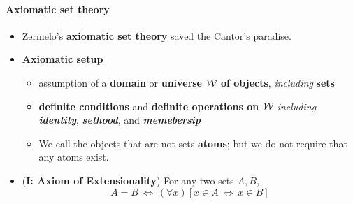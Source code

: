 \documentclass{myproc}
\begin{document}
\paragraph{Axiomatic set theory}
\begin{itemize}
\item Zermelo's {\bf{}axiomatic set theory} saved the Cantor's paradise.
\item {\bf{}Axiomatic setup}
	\begin{itemize}
	\item assumption of a {\bf{}domain} or {\bf{}universe $\cal{}W$ of
	objects}, {\em{}including} {\bf{}sets}
	\item {\bf{}definite conditions} and {\bf{}definite operations on 
		$\cal{}W$} {\em{}including} 
		{\em{}\bfseries{}identity},
		{\em{}\bfseries{}sethood}, and
		{\em{}\bfseries{}memebersip}
	\item We call the objects that are not sets {\bf{}atoms}; but we 
		do not require that any atoms exist.
	\end{itemize}
\item ({\bf{}I: Axiom of Extensionality}) For any two sets
	$A, B$,
		\[ A = B \ \Leftrightarrow\ (\forall{x})[x \in A \ \Leftrightarrow\ 
			x \in B] \]


\end{itemize}
\end{document}
